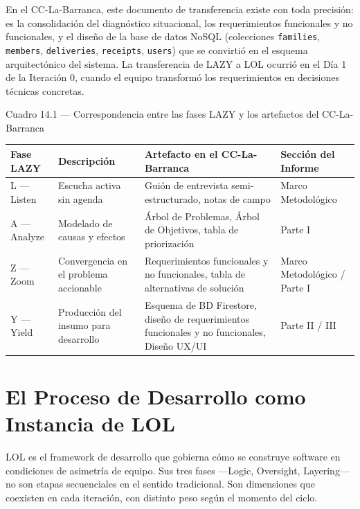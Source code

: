 \documentclass[14pt,a4paper,oneside]{extbook}
\begin{document}
En el CC-La-Barranca, este documento de transferencia existe con toda precisión: es la consolidación del diagnóstico situacional, los requerimientos funcionales y no funcionales, y el diseño de la base de datos NoSQL (colecciones \texttt{families}, \texttt{members}, \texttt{deliveries}, \texttt{receipts}, \texttt{users}) que se convirtió en el esquema arquitectónico del sistema. La transferencia de LAZY a LOL ocurrió en el Día 1 de la Iteración 0, cuando el equipo transformó los requerimientos en decisiones técnicas concretas.



Cuadro 14.1 --- Correspondencia entre las fases LAZY y los artefactos del CC-La-Barranca

\begin{table}[htbp]
\centering
\begin{tabular}{p{} p{} p{} p{}}
\toprule
\textbf{Fase LAZY} & \textbf{Descripción} & \textbf{Artefacto en el CC-La-Barranca} & \textbf{Sección del Informe} \\
\midrule
L — Listen & Escucha activa sin agenda & Guión de entrevista semi-estructurado, notas de campo & Marco Metodológico \\
A — Analyze & Modelado de causas y efectos & Árbol de Problemas, Árbol de Objetivos, tabla de priorización & Parte I \\
Z — Zoom & Convergencia en el problema accionable & Requerimientos funcionales y no funcionales, tabla de alternativas de solución & Marco Metodológico / Parte I \\
Y — Yield & Producción del insumo para desarrollo & Esquema de BD Firestore, diseño de requerimientos funcionales y no funcionales, Diseño UX/UI & Parte II / III \\
\bottomrule
\end{tabular}
\end{table}





\section{El Proceso de Desarrollo como Instancia de LOL}

LOL es el framework de desarrollo que gobierna cómo se construye software en condiciones de asimetría de equipo. Sus tres fases ---Logic, Oversight, Layering--- no son etapas secuenciales en el sentido tradicional. Son dimensiones que coexisten en cada iteración, con distinto peso según el momento del ciclo.
\end{document}
